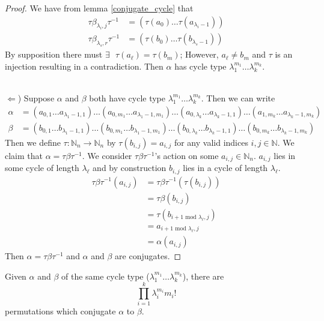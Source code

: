 \begin{proof}
		We have from lemma \ref{conjugate_cycle} that
		\begin{align*}
			\tau\beta_{\lambda_i, j}\tau^{-1} & = (\tau(a_0)\dots\tau(a_{\lambda_i-1})) \\
			\tau\beta_{\lambda_s, r}\tau^{-1} & = (\tau(b_0)\dots\tau(b_{\lambda_s-1}))
		\end{align*}
		By supposition there must $\exists\text{ }\tau(a_\ell) = \tau(b_m)$; However, $a_\ell \ne b_m$ and $\tau$ is an injection resulting in a contradiction. Then $\alpha$ has cycle type $\lambda_1^{m_1}\dots\lambda_k^{m_k}$.

	\text{}\\$\Leftarrow$) Suppose $\alpha$ and $\beta$ both have cycle type $\lambda_1^{m_1}\dots\lambda_k^{m_k}$. Then we can write
		\begin{align*}
			\alpha & = (a_{0,1}\dots a_{\lambda_1-1, 1})\dots(a_{0,m_1}\dots a_{\lambda_1-1,m_1})\dots(a_{0,\lambda_k}\dots a_{\lambda_k-1,1})\dots(a_{1,m_k}\dots a_{\lambda_k-1,m_k}) \\
			\beta  & = (b_{0,1}\dots b_{\lambda_1-1,1})\dots(b_{0,m_1}\dots b_{\lambda_1-1,m_1})\dots(b_{0,\lambda_k}\dots b_{\lambda_k-1,1})\dots(b_{0,m_k}\dots b_{\lambda_k-1,m_k})
		\end{align*}
		Then we define $\tau:\mathbb{N}_n\to\mathbb{N}_n$ by $\tau(b_{i, j}) = a_{i,j}$ for any valid indices $i,j\in\mathbb{N}$.
		We claim that $\alpha = \tau\beta\tau^{-1}$. We consider $\tau\beta\tau^{-1}$'s action on some $a_{i,j}\in\mathbb{N}_n$. $a_{i,j}$ lies in some cycle of length $\lambda_\ell$ and by construction $b_{i,j}$ lies in a cycle of length $\lambda_\ell$.
		\begin{align*}
			\tau\beta\tau^{-1}(a_{i,j}) & = \tau\beta\tau^{-1}(\tau(b_{i,j}))        \\
			                            & = \tau\beta(b_{i,j})                       \\
			                            & = \tau(b_{i+1\text{ mod }\lambda_\ell, j}) \\
			                            & = a_{i+1\text{ mod }\lambda_\ell, j}       \\
			                            & = \alpha(a_{i,j})
		\end{align*}
		Then $\alpha = \tau\beta\tau^{-1}$ and $\alpha$ and $\beta$ are conjugates.
\end{proof}
\begin{corr}
	Given $\alpha$ and $\beta$ of the same cycle type ($\lambda_1^{m_1}\dots\lambda_k^{m_k}$), there are
	\[
		\prod_{i=1}^{k}\lambda_i^{m_i}m_i!
	\]
	permutations which conjugate $\alpha$ to $\beta$.
\end{corr}
